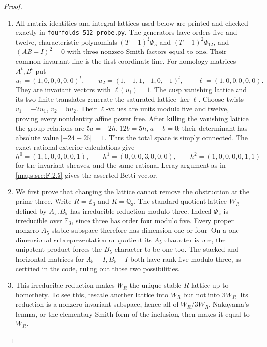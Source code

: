 \documentclass[11pt,a4paper]{article}
\theoremstyle{definition}
\begin{document}
\begin{proof}
\begin{enumerate}[label=\arabic*.]
\item All matrix identities and integral lattices used below are
printed and checked exactly in
\texttt{fourfolds\_512\_probe.py}.
The generators have orders five and twelve, characteristic
polynomials $(T-1)^2\Phi_5$ and $(T-1)^2\Phi_{12}$,
and $(AB-I)^2=0$ with three nonzero Smith factors equal to one.
Their common invariant line is the first coordinate line.
For homology matrices $A^t,B^t$ put
\[
 u_1=(1,0,0,0,0,0)^t,\qquad
 u_2=(1,-1,1,-1,0,-1)^t,
 \qquad \ell=(1,0,0,0,0,0).
\]
They are invariant vectors with $\ell(u_i)=1$.
The cusp vanishing lattice and its two finite translates
generate the saturated lattice $\ker\ell$.
Choose twists $v_1=-2u_1$, $v_2=5u_2$.
Their $\ell$-values are units modulo five and twelve, proving
every nonidentity affine power free.
After killing the vanishing lattice the group relations are
$5a=-2h$, $12b=5h$, $a+b=0$; their determinant has absolute
value $|-24+25|=1$.  Thus the total space is simply connected.
The exact rational exterior calculations give
\[
 h^0=(1,1,0,0,0,0,1),\qquad
 h^1=(0,0,0,3,0,0,0),\qquad
 h^2=(1,0,0,0,0,1,1)
\]
for the invariant sheaves, and the same rational Leray
argument as in \ref{maps:src:F.2.5} gives the asserted Betti vector.

\item We first prove that changing the lattice cannot remove the
obstruction at the prime three.  Write $R=\mathbb Z_3$ and
$K=\mathbb Q_3$.  The standard quotient lattice $W_R$ defined
by $A_5,B_5$ has irreducible reduction modulo three.
Indeed $\Phi_5$ is irreducible over $\mathbb F_3$, since
three has order four modulo five.  Every proper nonzero
$A_5$-stable subspace therefore has dimension one or four.
On a one-dimensional subrepresentation or quotient its
$A_5$ character is one; the unipotent product forces the
$B_5$ character to be one too.  The stacked and horizontal
matrices for $A_5-I,B_5-I$ both have rank five modulo three,
as certified in the code, ruling out those two possibilities.

\item This irreducible reduction makes $W_R$ the unique stable
$R$-lattice up to homothety.  To see this, rescale another
lattice into $W_R$ but not into $3W_R$.  Its reduction is
a nonzero invariant subspace, hence all of $W_R/3W_R$.
Nakayama's lemma, or the elementary Smith form of the
inclusion, then makes it equal to $W_R$.


\end{enumerate}
\end{proof}
\end{document}
